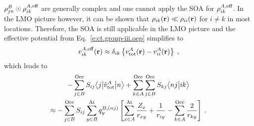 $\rho^B_{jn} \odot \rho^{A,{\rm eff}}_{ik}$ are generally complex and one cannot apply the SOA
for $\rho^{A,{\rm eff}}_{ik}$. In the LMO picture however, it can be shown that
$\rho_{ik} ({\bf r}) \ll \rho_{ii} ({\bf r})$ 
for $i\ne k$ in most locations. Therefore,
the SOA is still applicable in the LMO picture
and the effective potential from Eq.~\eqref{e:ct.group-iii.oep} 
simplifies to
%
\begin{equation} \label{e:ct.group-iii.oep.simplified}
 {v}^{A,{\rm eff}}_{ik}({\bf r}) \approx
 \delta_{ik} \left\{
 {v}^A_{\rm tot} ({\bf r})- {v}^A_{ii} ({\bf r}) \right\} \;,
\end{equation}
%
which
leads to 
%
\begin{multline} \label{e:ct.group-iii.final.b}
        - \sum_{j\in B}^{\rm Occ} S_{ij} \bigl\langle {j} \bigl\lvert {\hat{v}^A_{\rm tot} } \bigl\lvert {n} \bigr\rangle  
     + \sum_{k\in A}^{\rm Occ} \sum_{j\in B}^{\rm Occ}  
        S_{kj}
        \bigl\langle {nj} \bigl\lvert {ik} \bigr\rangle  \\
 \approx  -
 \sum_{j\in B}^{\rm Occ} S_{ij}
 \sum_{y\in B}^{\rm At} 
 q^{B,(nj)}_{y} 
 \left[ 
   \sum_{x\in A}^{\rm At}
   \frac{Z_x}{r_{xy}}
  + \frac{1}{r_{iy}}
  - \sum_{k\in A}^{\rm Occ}
    \frac{2}{r_{ky}} 
 \right]
 \;.
\end{multline}
%


